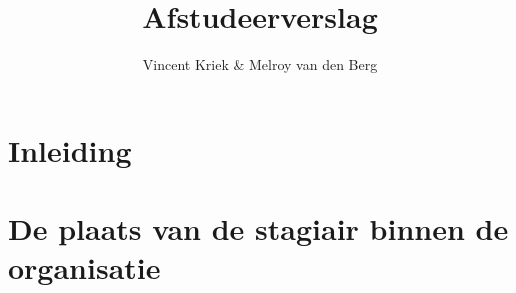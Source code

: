 \documentclass{article}
\begin{document}
\title{Afstudeerverslag}
\author{Vincent Kriek \& Melroy van den Berg}

\section{Inleiding}

\section{De plaats van de stagiair binnen de organisatie}
\end{document}
